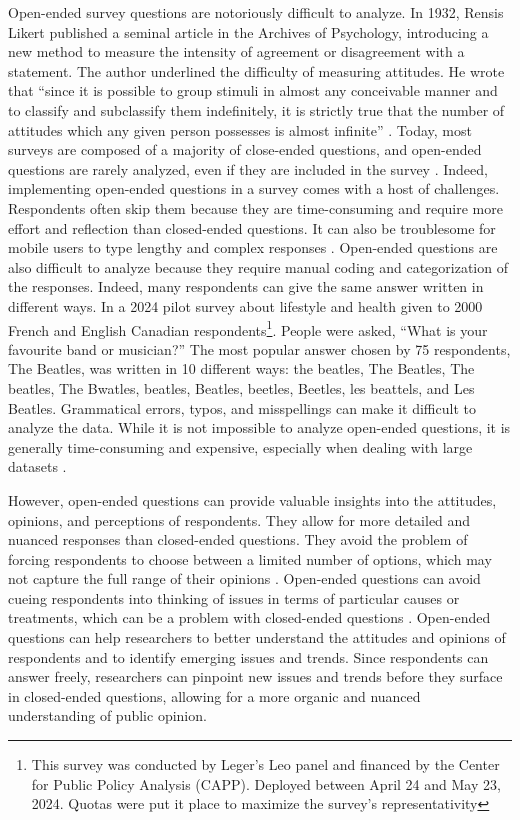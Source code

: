 \documentclass[
  authoryear,
  preprint,
  3p]{elsarticle}
\begin{document}
Open-ended survey questions are notoriously difficult to analyze. In
1932, Rensis Likert published a seminal article in the Archives of
Psychology, introducing a new method to measure the intensity of
agreement or disagreement with a statement. The author underlined the
difficulty of measuring attitudes. He wrote that ``since it is possible
to group stimuli in almost any conceivable manner and to classify and
subclassify them indefinitely, it is strictly true that the number of
attitudes which any given person possesses is almost infinite''
\citep{likert32}. Today, most surveys are composed of a majority of
close-ended questions, and open-ended questions are rarely analyzed,
even if they are included in the survey \citep{roberts_etal14}. Indeed,
implementing open-ended questions in a survey comes with a host of
challenges. Respondents often skip them because they are time-consuming
and require more effort and reflection than closed-ended questions. It
can also be troublesome for mobile users to type lengthy and complex
responses \citep{dillman_etal14}. Open-ended questions are also
difficult to analyze because they require manual coding and
categorization of the responses. Indeed, many respondents can give the
same answer written in different ways. In a 2024 pilot survey about
lifestyle and health given to 2000 French and English Canadian
respondents\footnote{This survey was conducted by Leger's Leo panel and
  financed by the Center for Public Policy Analysis (CAPP). Deployed
  between April 24 and May 23, 2024. Quotas were put it place to
  maximize the survey's representativity}. People were asked, ``What is
your favourite band or musician?'' The most popular answer chosen by 75
respondents, The Beatles, was written in 10 different ways: the beatles,
The Beatles, The beatles, The Bwatles, beatles, Beatles, beetles,
Beetles, les beattels, and Les Beatles. Grammatical errors, typos, and
misspellings can make it difficult to analyze the data. While it is not
impossible to analyze open-ended questions, it is generally
time-consuming and expensive, especially when dealing with large
datasets
\citep{dillman_etal14, bradburn_etal04, roberts_etal14, schuman_presser96}.

However, open-ended questions can provide valuable insights into the
attitudes, opinions, and perceptions of respondents. They allow for more
detailed and nuanced responses than closed-ended questions. They avoid
the problem of forcing respondents to choose between a limited number of
options, which may not capture the full range of their opinions
\citep{dillman_etal14}. Open-ended questions can avoid cueing
respondents into thinking of issues in terms of particular causes or
treatments, which can be a problem with closed-ended questions
\citep{roberts_etal14, iyengar96}. Open-ended questions can help
researchers to better understand the attitudes and opinions of
respondents and to identify emerging issues and trends. Since
respondents can answer freely, researchers can pinpoint new issues and
trends before they surface in closed-ended questions, allowing for a
more organic and nuanced understanding of public opinion.
\end{document}
